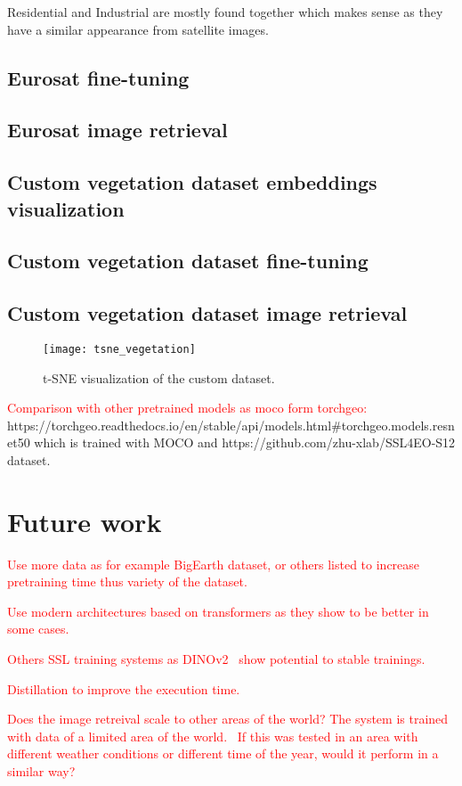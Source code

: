 \documentclass[conference]{IEEEtran}
\begin{document}
    Residential and Industrial are mostly found together which makes sense as they have a similar appearance from satellite images.

    \subsection{Eurosat fine-tuning}

    \subsection{Eurosat image retrieval}

    \subsection{Custom vegetation dataset embeddings visualization}

    \subsection{Custom vegetation dataset fine-tuning}

    \subsection{Custom vegetation dataset image retrieval}



    \begin{figure}[h]
        \centering
        \texttt{[image: tsne\_vegetation]}
        \caption{t-SNE visualization of the custom dataset.}
        \label{fig:tsne_vegetation}
    \end{figure}

    \textcolor{red}{Comparison with other pretrained models as moco form torchgeo:}
    https://torchgeo.readthedocs.io/en/stable/api/models.html#torchgeo.models.resnet50 which is trained with MOCO and https://github.com/zhu-xlab/SSL4EO-S12 dataset.


    \section{Future work}
    \textcolor{red}{
        Use more data as for example BigEarth dataset, or others listed to increase pretraining time thus variety of the dataset.

        Use modern architectures based on transformers as they show to be better in some cases.

        Others SSL training systems as DINOv2~\cite{DINO} show potential to stable trainings.

        Distillation to improve the execution time.

        Does the image retreival scale to other areas of the world? The system is trained with data of a limited area of the world.~\cite{de2021continual, purushwalkam2022challenges, kirkpatrick2017overcoming, 10135093}
        If this was tested in an area with different weather conditions or different time of the year, would it perform in a similar way?

    }
\end{document}
